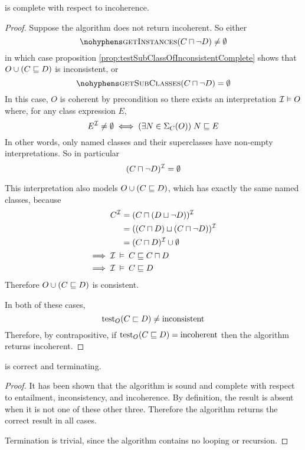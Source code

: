 \documentclass[paper.tex]{subfiles}
\begin{document}
\begin{proposition}
  \label{prop:testSubClassOfIncoherentComplete}
   is complete with respect to incoherence.
\end{proposition}
\begin{proof}
  Suppose the algorithm does not return incoherent.  So either
  \[ \textproc{getInstances}(C \sqcap \neg D) \ne \emptyset \]
  in which case proposition \ref{prop:testSubClassOfInconsistentComplete} shows that $O \cup (C \sqsubseteq D)$ is inconsistent, or
  \[ \textproc{getSubClasses}(C \sqcap \neg D) = \emptyset \]
  In this case, $O$ is coherent by precondition so there exists an interpretation $\mathcal{I} \vDash O$ where, for any class expression $E$,
  \[ E^{\mathcal{I}} \ne \emptyset \iff (\exists N \in \Sigma_C(O)) \; N \sqsubseteq E \]
  In other words, only named classes and their superclasses have non-empty interpretations.  So in particular
  \[ (C \sqcap \neg D)^{\mathcal{I}} = \emptyset \]

  This interpretation also models $O \cup (C \sqsubseteq D)$, which has exactly the same named classes, because
  \begin{align*}
    & \begin{aligned}
      C^{\mathcal{I}} &= (C \sqcap (D \sqcup \neg D))^{\mathcal{I}} \\
      &= ((C \sqcap D) \sqcup (C \sqcap \neg D))^{\mathcal{I}} \\
      &= (C \sqcap D)^{\mathcal{I}} \cup \emptyset
    \end{aligned} \\
    \implies{}& \mathcal{I} \:\vDash\: C \sqsubseteq C \sqcap D \\
    \implies{}& \mathcal{I} \:\vDash\: C \sqsubseteq D
  \end{align*}
  Therefore $O \cup (C \sqsubseteq D)$ is consistent.

  In both of these cases,
  \[ \operatorname{test}_O(C \sqsubset D) \ne \mathrm{inconsistent} \]
  Therefore, by contrapositive, if $\operatorname{test}_O(C \sqsubseteq D) = \mathrm{incoherent}$ then the algorithm returns incoherent.
\end{proof}

\begin{theorem}
   is correct and terminating.
\end{theorem}
\begin{proof}
  It has been shown that the algorithm is sound and complete with respect to entailment, inconsistency, and incoherence.  By definition, the result is absent when it is not one of these other three.  Therefore the algorithm returns the correct result in all cases.

  Termination is trivial, since the algorithm contains no looping or recursion.
\end{proof}
\end{document}
